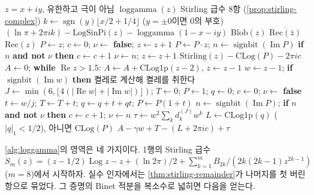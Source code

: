 \begin{algorithm}[htbp]
\begin{algorithmic}[1]
\Require $z=x+iy$, 유한하고 극이 아님
\Ensure $\operatorname{loggamma}(z)$
 \Return Stirling 급수 $8$항 (\cref{prop:stirling-complex}) \EndIf
{} 
  \State $k\gets\operatorname{sgn}(y)\lfloor x/2+1/4\rfloor$ ($y=\pm0$이면 $0$의 부호)
  \State \Return $(\ln\pi+2\pi ik)-\textrm{LogSinPi}(z)-\operatorname{loggamma}(1-x-iy)$ 
\EndIf
{} \Return \textrm{Blob}$(z)$ 
\EndIf
{} \Return $\overline{\textrm{Rec}(\bar z)}$ \EndIf
\State \Return \textrm{Rec}$(z)$
\Statex
{} 
  \State $P\gets z$; $c\gets0$; $\nu\gets$ \textbf{false}; $z\gets z+1$
    \State $P\gets P\cdot z$; $n\gets\operatorname{signbit}(\operatorname{Im}P)$
    \State \textbf{if} $n$ \textbf{and not} $\nu$ \textbf{then} $c\gets c+1$ 
    \State $\nu\gets n$; $z\gets z+1$
  \EndWhile
  \State \Return $\mathrm{Stirling}(z)-\textrm{CLog}(P)-2\pi ic$
\EndFunction
\Statex
{} 
  \State $A\gets0$; \textbf{while} $\operatorname{Re}z>1.5$: $A\gets A+\textrm{CLog1p}(z-2)$, $z\gets z-1$
  \State $w\gets z-1$; \textbf{if} $\operatorname{signbit}(\operatorname{Im}w)$ \textbf{then} 켤레로 계산해 켤레를 취한다
  \State $J\gets\min(6,\lfloor4(|\operatorname{Re}w|+|\operatorname{Im}w|)\rfloor)$; $T\gets0$; $P\gets1$; $q\gets0$; $c\gets0$; $\nu\gets$ \textbf{false}
    \State $t\gets w/j$; $T\gets T+t$; $q\gets q+t+qt$; $P\gets P(1+t)$ 
    \State $n\gets\operatorname{signbit}(\operatorname{Im}P)$; \textbf{if} $n$ \textbf{and not} $\nu$ \textbf{then} $c\gets c+1$; $\nu\gets n$
  \EndFor
  \State $\tau\gets w^2\sum_kd^{(J)}_kw^k$ 
  \State $L\gets\textrm{CLog1p}(q)$ ($|q|_1<1/2$), 아니면 $\textrm{CLog}(P)$
  \State \Return $A-\gamma w+T-(L+2\pi ic)+\tau$
\EndFunction
\end{algorithmic}
\caption{log-gamma의 주가지 (stardust )}
\label{alg:loggamma}
\end{algorithm}

\cref{alg:loggamma}의 영역은 네 가지이다. 1행의 Stirling 급수 $S_m(z)=(z-1/2)\operatorname{Log}z-z+(\ln2\pi)/2+\sum_{k=1}^mB_{2k}/(2k(2k-1)z^{2k-1})$($m=8$)에서 시작하자. 실수 인자에서는 \cref{thm:stirling-remainder}가 나머지를 첫 버린 항으로 묶었다. 그 증명의 Binet 적분을 복소수로 넓히면 다음을 얻는다.

